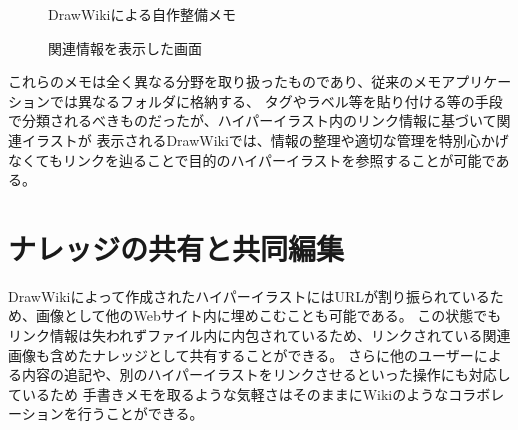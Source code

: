 \begin{figure}[H] \begin{minipage}{0.5\hsize}
                      \begin{center} 
                      \end{center} \caption{DrawWikiによる自作整備メモ} \label{fig:oremanual1}
\end{minipage} \begin{minipage}{0.5\hsize}
                   \begin{center} 
                   \end{center} \caption{関連情報を表示した画面} \label{fig:oremanual2}
\end{minipage}
\end{figure}

これらのメモは全く異なる分野を取り扱ったものであり、従来のメモアプリケーションでは異なるフォルダに格納する、
タグやラベル等を貼り付ける等の手段で分類されるべきものだったが、ハイパーイラスト内のリンク情報に基づいて関連イラストが
表示されるDrawWikiでは、情報の整理や適切な管理を特別心かげなくてもリンクを辿ることで目的のハイパーイラストを参照することが可能である。

\section{ナレッジの共有と共同編集}
DrawWikiによって作成されたハイパーイラストにはURLが割り振られているため、画像として他のWebサイト内に埋めこむことも可能である。
この状態でもリンク情報は失われずファイル内に内包されているため、リンクされている関連画像も含めたナレッジとして共有することができる。
さらに他のユーザーによる内容の追記や、別のハイパーイラストをリンクさせるといった操作にも対応しているため
手書きメモを取るような気軽さはそのままにWikiのようなコラボレーションを行うことができる。


